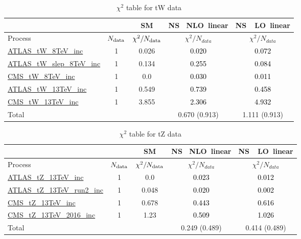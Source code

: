 \documentclass{article}
\begin{document}
\begin{table}[H]
\centering
\begin{tabular}{|l|c|c|c|c|}
\hline
 \multicolumn{2}{|c|}{} & SM& \rm NS \ NLO\ linear& \rm NS\ \ LO\ linear\\ \hline
Process & $N_{\rm data}$ & $\chi^ 2/N_{\rm data}$& $\chi^ 2/N_{data}$& $\chi^ 2/N_{data}$\\ \hline
\href{https://arxiv.org/abs/1510.03752}{ATLAS_tW_8TeV_inc} & 1 & 0.026 & \textcolor{black}                            {0.020} & \textcolor{black}                            {0.072} \\ \hline
\href{https://arxiv.org/abs/2007.01554}{ATLAS_tW_slep_8TeV_inc} & 1 & 0.134 & \textcolor{black}                            {0.255} & \textcolor{black}                            {0.084} \\ \hline
\href{https://arxiv.org/abs/1401.2942}{CMS_tW_8TeV_inc} & 1 & 0.0 & \textcolor{black}                            {0.030} & \textcolor{black}                            {0.011} \\ \hline
\href{https://arxiv.org/abs/1612.07231}{ATLAS_tW_13TeV_inc} & 1 & 0.549 & \textcolor{black}                            {0.739} & \textcolor{black}                            {0.458} \\ \hline
\href{https://arxiv.org/abs/1805.07399}{CMS_tW_13TeV_inc} & 1 & 3.855 & \textcolor{black}                            {2.306} & \textcolor{black}                            {4.932} \\ \hline
\hline Total & &  & 0.670 (0.913) & 1.111 (0.913) \\ \hline
\end{tabular}
\caption{$\chi^2$ table for tW data}
\end{table}
\begin{table}[H]
\centering
\begin{tabular}{|l|c|c|c|c|}
\hline
 \multicolumn{2}{|c|}{} & SM& \rm NS \ NLO\ linear& \rm NS\ \ LO\ linear\\ \hline
Process & $N_{\rm data}$ & $\chi^ 2/N_{\rm data}$& $\chi^ 2/N_{data}$& $\chi^ 2/N_{data}$\\ \hline
\href{https://arxiv.org/abs/1712.02825}{ATLAS_tZ_13TeV_inc} & 1 & 0.0 & \textcolor{black}                            {0.023} & \textcolor{black}                            {0.012} \\ \hline
\href{https://arxiv.org/abs/2002.07546}{ATLAS_tZ_13TeV_run2_inc} & 1 & 0.048 & \textcolor{black}                            {0.020} & \textcolor{black}                            {0.002} \\ \hline
\href{https://arxiv.org/abs/1712.02825}{CMS_tZ_13TeV_inc} & 1 & 0.678 & \textcolor{black}                            {0.443} & \textcolor{black}                            {0.616} \\ \hline
\href{https://arxiv.org/abs/1812.05900}{CMS_tZ_13TeV_2016_inc} & 1 & 1.23 & \textcolor{black}                            {0.509} & \textcolor{black}                            {1.026} \\ \hline
\hline Total & &  & 0.249 (0.489) & 0.414 (0.489) \\ \hline
\end{tabular}
\caption{$\chi^2$ table for tZ data}
\end{table}
\end{document}
